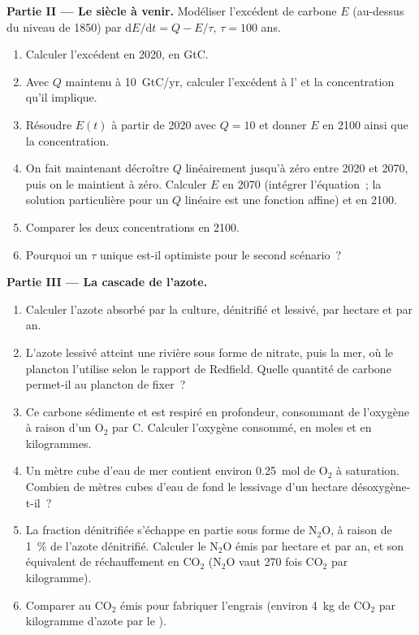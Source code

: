 \begin{problem}
\medskip
\noindent\textbf{Partie II --- Le siècle à venir.}
Modéliser l'excédent de carbone $E$ (au-dessus du niveau de 1850) par
$\mathrm{d}E/\mathrm{d}t = Q - E/\tau$, $\tau = 100$ ans.
\begin{enumerate}[resume]
  \item Calculer l'excédent en 2020, en GtC.
  \item Avec $Q$ maintenu à \qty{10}{GtC/yr}, calculer l'excédent à l' et la concentration qu'il implique.
  \item Résoudre $E(t)$ à partir de 2020 avec $Q = 10$ et donner $E$ en
        2100 ainsi que la concentration.
  \item On fait maintenant décroître $Q$ linéairement jusqu'à zéro entre
        2020 et 2070, puis on le maintient à zéro. Calculer $E$ en 2070
        (intégrer l'équation~; la solution particulière pour un $Q$
        linéaire est une fonction affine) et en 2100.
  \item Comparer les deux concentrations en 2100.
  \item Pourquoi un $\tau$ unique est-il optimiste pour le second
        scénario~?
\end{enumerate}

\medskip
\noindent\textbf{Partie III --- La cascade de l'azote.}
\begin{enumerate}[resume]
  \item Calculer l'azote absorbé par la culture, dénitrifié et
        lessivé, par hectare et par an.
  \item L'azote lessivé atteint une rivière sous forme de nitrate, puis
        la mer, où le plancton l'utilise selon le rapport de Redfield.
        Quelle quantité de carbone permet-il au plancton de fixer~?
  \item Ce carbone sédimente et est respiré en profondeur, consommant de
        l'oxygène à raison d'un $\mathrm{O_2}$ par C. Calculer l'oxygène
        consommé, en moles et en kilogrammes.
  \item Un mètre cube d'eau de mer contient environ \qty{0.25}{mol} de
        $\mathrm{O_2}$ à saturation. Combien de mètres cubes d'eau de fond
        le lessivage d'un hectare désoxygène-t-il~?
  \item La fraction dénitrifiée s'échappe en partie sous forme de $\mathrm{N_2O}$,
        à raison de \qty{1}{\%} de l'azote dénitrifié. Calculer le $\mathrm{N_2O}$
        émis par hectare et par an, et son équivalent de réchauffement en $\mathrm{CO_2}$
        ($\mathrm{N_2O}$ vaut 270 fois $\mathrm{CO_2}$ par kilogramme).
  \item Comparer au $\mathrm{CO_2}$ émis pour fabriquer l'engrais
        (environ \qty{4}{kg} de $\mathrm{CO_2}$ par kilogramme d'azote par
        le ).
\end{enumerate}


\end{problem}

